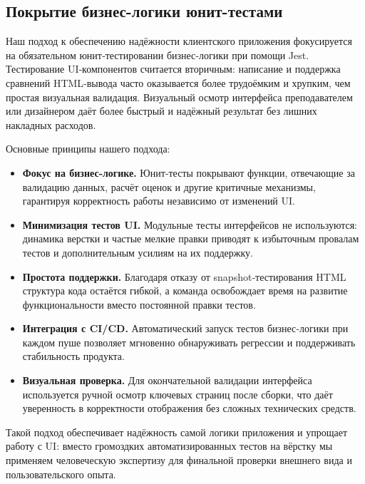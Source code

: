 \subsection{Покрытие бизнес-логики юнит-тестами}

Наш подход к обеспечению надёжности клиентского приложения фокусируется на обязательном юнит‑тестировании бизнес‑логики при помощи Jest. Тестирование UI‑компонентов считается вторичным: написание и поддержка сравнений HTML‑вывода часто оказывается более трудоёмким и хрупким, чем простая визуальная валидация. Визуальный осмотр интерфейса преподавателем или дизайнером даёт более быстрый и надёжный результат без лишних накладных расходов.

Основные принципы нашего подхода:
\begin{itemize}
	\item \textbf{Фокус на бизнес‑логике.} Юнит‑тесты покрывают функции, отвечающие за валидацию данных, расчёт оценок и другие критичные механизмы, гарантируя корректность работы независимо от изменений UI.
	\item \textbf{Минимизация тестов UI.} Модульные тесты интерфейсов не используются: динамика верстки и частые мелкие правки приводят к избыточным провалам тестов и дополнительным усилиям на их поддержку.
	\item \textbf{Простота поддержки.} Благодаря отказу от snapshot‑тестирования HTML структура кода остаётся гибкой, а команда освобождает время на развитие функциональности вместо постоянной правки тестов.
	\item \textbf{Интеграция с CI/CD.} Автоматический запуск тестов бизнес‑логики при каждом пуше позволяет мгновенно обнаруживать регрессии и поддерживать стабильность продукта.
	\item \textbf{Визуальная проверка.} Для окончательной валидации интерфейса используется ручной осмотр ключевых страниц после сборки, что даёт уверенность в корректности отображения без сложных технических средств.
\end{itemize}

Такой подход обеспечивает надёжность самой логики приложения и упрощает работу с UI: вместо громоздких автоматизированных тестов на вёрстку мы применяем человеческую экспертизу для финальной проверки внешнего вида и пользовательского опыта.
